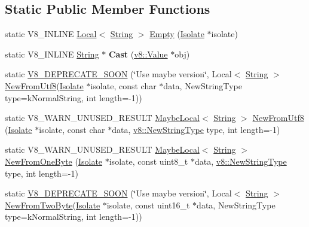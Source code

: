\subsection*{Static Public Member Functions}
\begin{DoxyCompactItemize}
\item 
static V8\+\_\+\+I\+N\+L\+I\+NE \mbox{\hyperlink{classv8_1_1Local}{Local}}$<$ \mbox{\hyperlink{classv8_1_1String}{String}} $>$ \mbox{\hyperlink{classv8_1_1String_aa393d47baa54467fe57001065e49194b}{Empty}} (\mbox{\hyperlink{classv8_1_1Isolate}{Isolate}} $\ast$isolate)
\item 
\mbox{\label{classv8_1_1String_a826d60798dc152cea64a7636737b03b9}} 
static V8\+\_\+\+I\+N\+L\+I\+NE \mbox{\hyperlink{classv8_1_1String}{String}} $\ast$ {\bfseries Cast} (\mbox{\hyperlink{classv8_1_1Value}{v8\+::\+Value}} $\ast$obj)
\item 
static \mbox{\hyperlink{classv8_1_1String_aa9d64688e3535b3daabafcc46a59ce5a}{V8\+\_\+\+D\+E\+P\+R\+E\+C\+A\+T\+E\+\_\+\+S\+O\+ON}} (\char`\"{}Use maybe version\char`\"{}, Local$<$ \mbox{\hyperlink{classv8_1_1String}{String}} $>$ \mbox{\hyperlink{classv8_1_1String_a851bcf20fecb01b97f14131ce609f701}{New\+From\+Utf8}}(\mbox{\hyperlink{classv8_1_1Isolate}{Isolate}} $\ast$isolate, const char $\ast$data, New\+String\+Type type=k\+Normal\+String, int length=-\/1))
\item 
static V8\+\_\+\+W\+A\+R\+N\+\_\+\+U\+N\+U\+S\+E\+D\+\_\+\+R\+E\+S\+U\+LT \mbox{\hyperlink{classv8_1_1MaybeLocal}{Maybe\+Local}}$<$ \mbox{\hyperlink{classv8_1_1String}{String}} $>$ \mbox{\hyperlink{classv8_1_1String_a851bcf20fecb01b97f14131ce609f701}{New\+From\+Utf8}} (\mbox{\hyperlink{classv8_1_1Isolate}{Isolate}} $\ast$isolate, const char $\ast$data, \mbox{\hyperlink{namespacev8_ac9163ab12fb3b2a95907a3a0367c6095}{v8\+::\+New\+String\+Type}} type, int length=-\/1)
\item 
static V8\+\_\+\+W\+A\+R\+N\+\_\+\+U\+N\+U\+S\+E\+D\+\_\+\+R\+E\+S\+U\+LT \mbox{\hyperlink{classv8_1_1MaybeLocal}{Maybe\+Local}}$<$ \mbox{\hyperlink{classv8_1_1String}{String}} $>$ \mbox{\hyperlink{classv8_1_1String_a2b8cf518523a62d97360c07ed33d8aa6}{New\+From\+One\+Byte}} (\mbox{\hyperlink{classv8_1_1Isolate}{Isolate}} $\ast$isolate, const uint8\+\_\+t $\ast$data, \mbox{\hyperlink{namespacev8_ac9163ab12fb3b2a95907a3a0367c6095}{v8\+::\+New\+String\+Type}} type, int length=-\/1)
\item 
static \mbox{\hyperlink{classv8_1_1String_aeab948105979e2ffd61eb552b0da4e50}{V8\+\_\+\+D\+E\+P\+R\+E\+C\+A\+T\+E\+\_\+\+S\+O\+ON}} (\char`\"{}Use maybe version\char`\"{}, Local$<$ \mbox{\hyperlink{classv8_1_1String}{String}} $>$ \mbox{\hyperlink{classv8_1_1String_aaad4c7c856c29d79db85994c301fe601}{New\+From\+Two\+Byte}}(\mbox{\hyperlink{classv8_1_1Isolate}{Isolate}} $\ast$isolate, const uint16\+\_\+t $\ast$data, New\+String\+Type type=k\+Normal\+String, int length=-\/1))

\end{DoxyCompactItemize}
